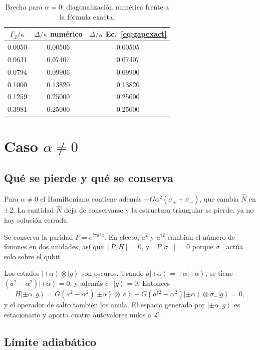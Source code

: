 \documentclass[11pt]{report}
\newcommand{\ket}[1]{\left|#1\right\rangle}
\newcommand{\spl}{\sigma_{+}}
\newcommand{\smi}{\sigma_{-}}
\newcommand{\GG}{\Gamma_{2}}
\newcommand{\Lv}{\mathcal{L}}
\begin{document}
\begin{table}[h]
\centering
\begin{tabular}{ccc}
\toprule
$\GG/\kappa$ & $\Delta/\kappa$ num\'erico & $\Delta/\kappa$ Ec.~\eqref{eq:gapexact}\\
\midrule
0.0050 & 0.00506 & 0.00505\\
0.0631 & 0.07407 & 0.07407\\
0.0794 & 0.09906 & 0.09900\\
0.1000 & 0.13820 & 0.13820\\
0.1259 & 0.25000 & 0.25000\\
0.3981 & 0.25000 & 0.25000\\
\bottomrule
\end{tabular}
\caption{Brecha para $\alpha=0$: diagonalizaci\'on num\'erica frente a la f\'ormula exacta.}
\label{tab:alpha0}
\end{table}

\section{Caso $\alpha\neq 0$}

\subsection{Qu\'e se pierde y qu\'e se conserva}

Para $\alpha\neq0$ el Hamiltoniano contiene adem\'as $-G\alpha^{2}(\spl+\smi)$, que cambia $\hat N$ en $\pm2$. La cantidad $\hat N$ deja de conservarse y la estructura triangular se pierde: ya no hay soluci\'on cerrada.

Se conserva la paridad $P=e^{i\pi a^{\dagger}a}$. En efecto, $a^{2}$ y $a^{\dagger 2}$ cambian el n\'umero de fonones en dos unidades, as\'i que $[P,H]=0$, y $[P,\smi]=0$ porque $\smi$ act\'ua solo sobre el qubit.

Los estados $\ket{\pm\alpha}\otimes\ket{g}$ son oscuros. Usando $a\ket{\pm\alpha}=\pm\alpha\ket{\pm\alpha}$, se tiene $(a^{2}-\alpha^{2})\ket{\pm\alpha}=0$, y adem\'as $\smi\ket{g}=0$. Entonces
\begin{equation}
H\ket{\pm\alpha,g} = G(a^{2}-\alpha^{2})\ket{\pm\alpha}\otimes\ket{e} + G(a^{\dagger 2}-\alpha^{2})\ket{\pm\alpha}\otimes\smi\ket{g} = 0,
\end{equation}
y el operador de salto tambi\'en los anula. El espacio generado por $\ket{\pm\alpha,g}$ es estacionario y aporta cuatro autovalores nulos a $\Lv$.

\subsection{L\'imite adiab\'atico}
\end{document}
